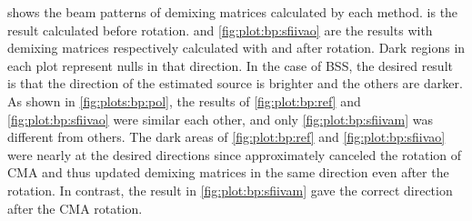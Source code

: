 \documentclass[sip,biber]{now-journal}
\begin{document}
 shows the beam patterns of demixing matrices calculated by each method.
 is the result calculated before rotation.
 and \cref{fig:plot:bp:sfiivao} are the results with demixing matrices respectively calculated with \SFIIVAo{} and \SFIIVAm{} after rotation.
Dark regions in each plot represent nulls in that direction.
In the case of BSS, the desired result is that the direction of the estimated source is brighter and the others are darker.
As shown in \cref{fig:plots:bp:pol}, the results of \cref{fig:plot:bp:ref} and \cref{fig:plot:bp:sfiivao} were similar each other, and only \cref{fig:plot:bp:sfiivam} was different from others.
The dark areas of \cref{fig:plot:bp:ref} and \cref{fig:plot:bp:sfiivao} were nearly at the desired directions since \SFIIVAo{} approximately canceled the rotation of CMA and thus updated demixing matrices in the same direction even after the rotation.
In contrast, the result in \cref{fig:plot:bp:sfiivam} gave the correct direction after the CMA rotation.
\end{document}
